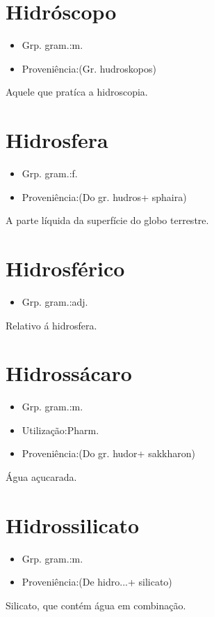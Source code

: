 \documentclass{article}
\begin{document}
\section{Hidróscopo}
\begin{itemize}
\item {Grp. gram.:m.}
\end{itemize}
\begin{itemize}
\item {Proveniência:(Gr. \textunderscore hudroskopos\textunderscore )}
\end{itemize}
Aquele que pratíca a hidroscopia.
\section{Hidrosfera}
\begin{itemize}
\item {Grp. gram.:f.}
\end{itemize}
\begin{itemize}
\item {Proveniência:(Do gr. \textunderscore hudros\textunderscore  + \textunderscore sphaira\textunderscore )}
\end{itemize}
A parte líquida da superfície do globo terrestre.
\section{Hidrosférico}
\begin{itemize}
\item {Grp. gram.:adj.}
\end{itemize}
Relativo á hidrosfera.
\section{Hidrossácaro}
\begin{itemize}
\item {Grp. gram.:m.}
\end{itemize}
\begin{itemize}
\item {Utilização:Pharm.}
\end{itemize}
\begin{itemize}
\item {Proveniência:(Do gr. \textunderscore hudor\textunderscore  + \textunderscore sakkharon\textunderscore )}
\end{itemize}
Água açucarada.
\section{Hidrossilicato}
\begin{itemize}
\item {Grp. gram.:m.}
\end{itemize}
\begin{itemize}
\item {Proveniência:(De \textunderscore hidro...\textunderscore  + \textunderscore silicato\textunderscore )}
\end{itemize}
Silicato, que contém água em combinação.
\end{document}
